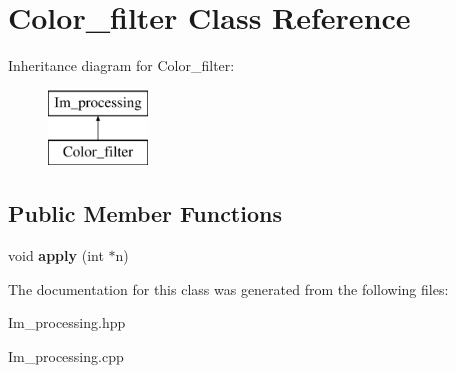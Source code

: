 \hypertarget{class_color__filter}{\section{Color\+\_\+filter Class Reference}
\label{class_color__filter}
}
Inheritance diagram for Color\+\_\+filter\+:\begin{figure}[H]
\begin{center}
\leavevmode
\includegraphics[height=2.000000cm]{class_color__filter}
\end{center}
\end{figure}
\subsection*{Public Member Functions}
\begin{DoxyCompactItemize}
\item 
\hypertarget{class_color__filter_a8cc00b7039652d79413886b762c2029a}{void {\bfseries apply} (int $\ast$n)}\label{class_color__filter_a8cc00b7039652d79413886b762c2029a}

\end{DoxyCompactItemize}


The documentation for this class was generated from the following files\+:\begin{DoxyCompactItemize}
\item 
Im\+\_\+processing.\+hpp\item 
Im\+\_\+processing.\+cpp\end{DoxyCompactItemize}
